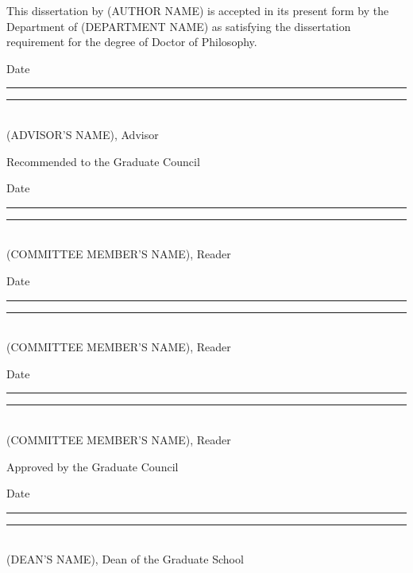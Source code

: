 \begin{center}
\vspace*{\fill}
This dissertation by (AUTHOR NAME) is accepted in its present form by the Department of (DEPARTMENT NAME) as satisfying the dissertation requirement for the degree of Doctor of Philosophy.

\vspace{1.5cm}

Date \rule{2.5cm}{0.05mm} \hspace{1cm} \rule{8cm}{0.05mm}\\
\hspace{5.3cm} (ADVISOR'S NAME), Advisor


\vspace{3cm}

Recommended to the Graduate Council

\vspace{1cm}

Date \rule{2.5cm}{0.05mm} \hspace{1cm} \rule{8cm}{0.05mm}\\
\hspace{5.3cm} (COMMITTEE MEMBER'S NAME), Reader\\

\vspace{1cm}

Date \rule{2.5cm}{0.05mm} \hspace{1cm} \rule{8cm}{0.05mm}\\
\hspace{5.3cm} (COMMITTEE MEMBER'S NAME), Reader\\

\vspace{1cm}


Date \rule{2.5cm}{0.05mm} \hspace{1cm} \rule{8cm}{0.05mm}\\
\hspace{5.3cm} (COMMITTEE MEMBER'S NAME), Reader\\

\vspace{3cm}

Approved by the Graduate Council

\vspace{1cm}

Date \rule{2.5cm}{0.05mm} \hspace{1cm} \rule{8cm}{0.05mm}\\
\hspace{5.4cm} (DEAN'S NAME), Dean of the Graduate School
\vspace*{\fill}
\end{center}